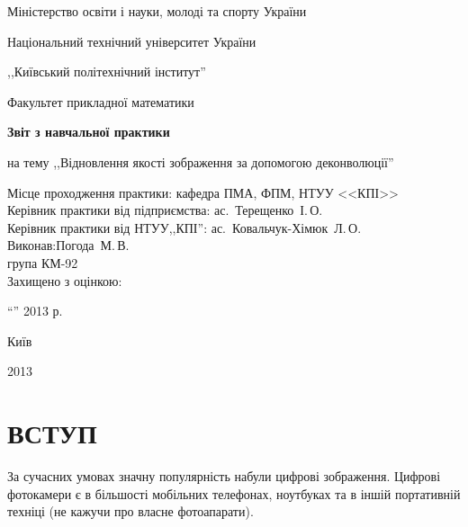 \documentclass[simple,14pt,utf8,ukrainian]{eskdtext}
\begin{document}
\begin{titlepage}
  \thispagestyle{empty}
  \begin{center}
\large

Міністерство освіти і науки, молоді та спорту України

Національний технічний університет України

,,Київський політехнічний інститут''

\vspace*{1cm}

Факультет прикладної математики
\vspace*{2cm}

\textbf{Звіт з навчальної практики}

\vspace*{1cm}

на тему ,,Відновлення якості зображення за допомогою деконволюції''

\end{center}
\vspace*{1.5cm}

\normalsize
Місце проходження практики: \hfill кафедра ПМА, ФПМ, НТУУ <<КПІ>>\\

Керівник практики від підприємства: \hfill ас.~Терещенко~І.\,О.\\

Керівник практики від НТУУ,,КПІ'': 	\hfill ас.~Ковальчук-Хімюк~Л.\,О. \\

Виконав:\hfill Погода~М.\,В.\\

\hfill група КМ-92\\

Захищено з оцінкою:	\underline{\hspace{5cm}}
\vspace*{1cm}

``\underline{\hspace{0.6cm}}'' \underline{\hspace{3cm}} 2013 р.

\vspace*{2cm}
\begin{center}
\large
Київ

2013
\end{center}
\end{titlepage}
\tableofcontents
\clearpage
\section*{ВСТУП}
  За сучасних умовах значну популярність набули цифрові зображення.
  Цифрові фотокамери є в більшості мобільних телефонах, ноутбуках та в іншій
  портативній техніці (не кажучи про власне фотоапарати).
\end{document}
